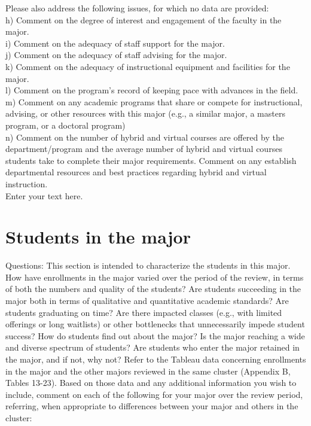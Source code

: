 \documentclass[12pt]{article}
\begin{document}
\noindent
Please also address the following issues, for which no data are provided:\\

    h) Comment on the degree of interest and engagement of the faculty in the major.\\
    i) Comment on the adequacy of staff support for the major.\\
    j) Comment on the adequacy of staff advising for the major.\\
    k) Comment on the adequacy of instructional equipment and facilities for the major.\\
    l) Comment on the program’s record of keeping pace with advances in the field.\\
    m) Comment on any academic programs that share or compete for instructional, advising, or other resources with this major (e.g., a similar major, a masters program, or a doctoral program)\\
    n) Comment on the number of hybrid and virtual courses are offered by the department/program and the average number of hybrid and virtual courses students take to complete their major requirements. Comment on any establish departmental resources and best practices regarding hybrid and virtual instruction.\\

Enter your text here.


\section{Students in the major}
Questions: This section is intended to characterize the students in this major. How have enrollments in the major varied over the period of the review, in terms of both the numbers and quality of the students? Are students succeeding in the major both in terms of qualitative and quantitative academic standards? Are students graduating on time? Are there impacted classes (e.g., with limited offerings or long waitlists) or other bottlenecks that unnecessarily impede student success? How do students find out about the major?  Is the major reaching a wide and diverse spectrum of students? Are students who enter the major retained in the major, and if not, why not?
Refer to the Tableau data concerning enrollments in the major and the other majors reviewed in the same cluster (Appendix B, Tables 13-23). Based on those data and any additional information you wish to include, comment on each of the following for your major over the review period, referring, when appropriate to differences between your major and others in the cluster:
\end{document}
